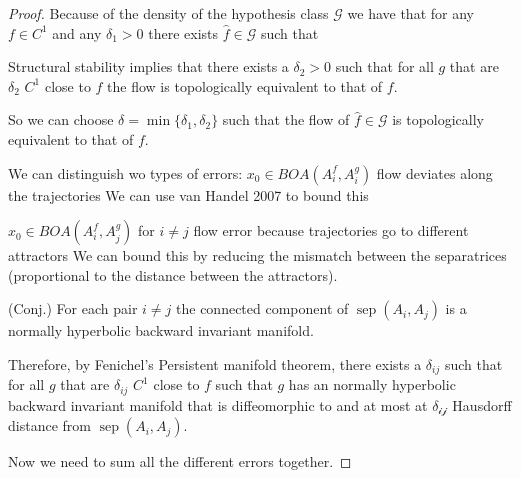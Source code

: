 \documentclass{article}
\theoremstyle{definition}
\theoremstyle{remark}
\newcommand{\sep}{\operatorname{sep}}
\begin{document}
\begin{proof}
Because of the density of the hypothesis class $\mathcal{G}$ we have that for any $f\in C^1$ and any $\delta_1>0$
there exists $\hat f\in\mathcal{G}$ such that 


Structural stability implies that there exists a $\delta_2>0$ such that for all $g$ that are $\delta_2$ $C^1$ close to $f$ the flow is topologically equivalent to that of $f$.

So we can choose $\delta = \min\{\delta_1,\delta_2\}$ such that the flow of $\hat f\in\mathcal{G}$ is topologically equivalent to that of $f$.



We can distinguish wo types of errors:
$x_0\in BOA(A_i^f,A_i^g)$ flow deviates along the trajectories
We can use van Handel 2007 to bound this


$x_0\in BOA(A_i^f,A_j^g)$ for $i\neq j$
flow error because trajectories go to different attractors
We can bound this by reducing the mismatch between the separatrices (proportional to the distance between the attractors).

(Conj.) For each pair $i\neq j$ the connected component of $\sep(A_i,A_j)$ is a normally hyperbolic backward invariant manifold.

Therefore, by Fenichel's Persistent manifold theorem, there exists a $\delta_{ij}$ such that for all $g$ that are $\delta_{ij}$ $C^1$ close to $f$ such that $g$ has an  normally hyperbolic backward invariant manifold that is diffeomorphic to and at most at $\mathcal{\delta_{ij}}$ Hausdorff distance from $\sep(A_i,A_j)$.


Now we need to sum all the different errors together.
\end{proof}
\end{document}
